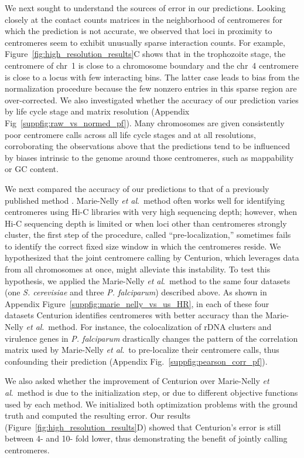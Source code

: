 We next sought to understand the sources of error in our predictions. Looking
closely at the contact counts matrices in the neighborhood of centromeres for
which the prediction is not accurate, we observed that loci in proximity to
centromeres seem to exhibit unusually sparse interaction counts. For example,
Figure~\ref{fig:high_resolution_results}C shows that in the trophozoite stage,
the centromere of chr~1 is close to a chromosome boundary and the chr~4
centromere is close to a locus with few interacting bins. The latter case
leads to bias from the normalization procedure because the few nonzero entries
in this sparse region are over-corrected. We also investigated whether the
accuracy of our prediction varies by life cycle stage and matrix resolution
(Appendix Fig~\ref{suppfig:raw_vs_normed_pf}). Many chromosomes are given
consistently poor centromere calls across all life cycle stages and at all
resolutions, corroborating the observations above that the predictions tend to
be influenced by biases intrinsic to the genome around those centromeres, such
as mappability or GC content.

We next compared the accuracy of our predictions to that of a previously
published method \citep{marie-nelly:filling}. Marie-Nelly
\textit{et al}.\
method often works well for identifying centromeres using Hi-C libraries with
very high sequencing depth; however, when Hi-C sequencing depth is limited or
when loci other than centromeres strongly cluster,
the first step of the procedure, called ``pre-localization,''
sometimes fails to identify the correct fixed size window in which the
centromeres reside.
We hypothesized that
the joint centromere calling by Centurion, which leverages data from all
chromosomes at once, might alleviate this instability. To test this
hypothesis, we applied the Marie-Nelly \textit{et al}.\
method to the same four
datasets (one \textit{S. cerevisiae} and three \textit{P. falciparum})
described above. As shown in Appendix 
Figure~\ref{suppfig:marie_nelly_vs_us_HR}, in each of these four
datasets Centurion identifies centromeres with better accuracy than the
Marie-Nelly \textit{et al}.\ method.
For instance, the colocalization of rDNA
clusters and virulence genes in \textit{P. falciparum} drastically changes the pattern
of the correlation matrix used by Marie-Nelly
\textit{et al}.\ to pre-localize
their centromere calls, thus confounding their prediction (Appendix
Fig.~\ref{suppfig:pearson_corr_pf}).

We also asked whether the improvement of Centurion over
Marie-Nelly \textit{et al}.\ method is due to the
initialization step, or
due to different objective functions used by each method. We initialized both
optimization problems with the ground truth and computed the resulting error.
Our results (Figure~\ref{fig:high_resolution_results}D) showed that
Centurion's error is still between 4- and 10- fold lower, thus demonstrating
the benefit of jointly calling centromeres.


